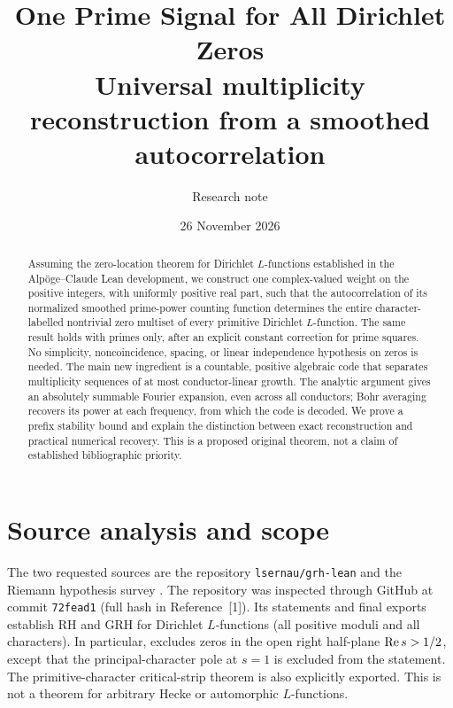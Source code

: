 \documentclass[11pt]{article}
\title{One Prime Signal for All Dirichlet Zeros\\\large Universal multiplicity reconstruction from a smoothed autocorrelation}
\author{Research note}
\date{26 November 2026}
\theoremstyle{remark}\newtheorem{remark}[theorem]{Remark}
\begin{document}
\maketitle
\begin{abstract}
Assuming the zero-location theorem for Dirichlet $L$-functions established in the Alp\"oge--Claude Lean development, we construct one complex-valued weight on the positive integers, with uniformly positive real part, such that the autocorrelation of its normalized smoothed prime-power counting function determines the entire character-labelled nontrivial zero multiset of every primitive Dirichlet $L$-function. The same result holds with primes only, after an explicit constant correction for prime squares. No simplicity, noncoincidence, spacing, or linear independence hypothesis on zeros is needed. The main new ingredient is a countable, positive algebraic code that separates multiplicity sequences of at most conductor-linear growth. The analytic argument gives an absolutely summable Fourier expansion, even across all conductors; Bohr averaging recovers its power at each frequency, from which the code is decoded. We prove a prefix stability bound and explain the distinction between exact reconstruction and practical numerical recovery. This is a proposed original theorem, not a claim of established bibliographic priority.
\end{abstract}

\section{Source analysis and scope}
The two requested sources are the repository \texttt{lsernau/grh-lean} \cite{repo} and the Riemann hypothesis survey \cite{wiki}. The repository was inspected through GitHub at commit \texttt{72fead1} (full hash in Reference~[1]). Its statements and final exports establish RH and GRH for Dirichlet $L$-functions (all positive moduli and all characters). In particular,  excludes zeros in the open right half-plane $\operatorname{Re} s>1/2$, except that the principal-character pole at $s=1$ is excluded from the statement. The primitive-character critical-strip theorem is also explicitly exported. This is not a theorem for arbitrary Hecke or automorphic $L$-functions.
\end{document}
